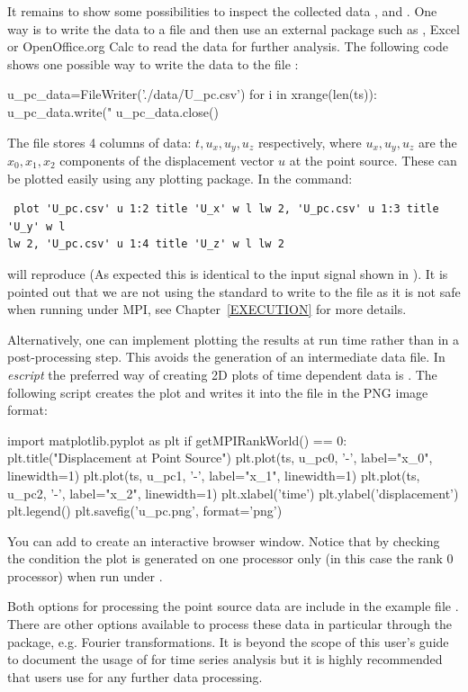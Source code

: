 It remains to show some possibilities to inspect the collected data
,  and .
One way is to write the data to a file and then use an external package such
as \gnuplot, Excel or OpenOffice.org Calc to read the data for further analysis.
The following code shows one possible way to write the data to the file :
\begin{python}
  u_pc_data=FileWriter('./data/U_pc.csv')
  for i in xrange(len(ts)):
      u_pc_data.write("%
  u_pc_data.close()
\end{python}
The file  stores 4 columns of data: $t,u_x,u_y,u_z$
respectively, where $u_x,u_y,u_z$ are the
$x_0,x_1,x_2$ components of the displacement
vector $u$ at the point source.
These can be plotted easily using any plotting package.
In \gnuplot the command:
\begin{verbatim}
 plot 'U_pc.csv' u 1:2 title 'U_x' w l lw 2, 'U_pc.csv' u 1:3 title 'U_y' w l
lw 2, 'U_pc.csv' u 1:4 title 'U_z' w l lw 2
\end{verbatim}
will reproduce  (As expected this is identical to the input
signal shown in ).
It is pointed out that we are not using the standard \PYTHON {}
to write to the file  as it is not safe when running \escript
under MPI, see Chapter~\ref{EXECUTION} for more details.

Alternatively, one can implement plotting the results at run time rather than
in a post-processing step.
This avoids the generation of an intermediate data file.
In {\it escript} the preferred way of creating 2D plots of time dependent data
is \MATPLOTLIB. The following script creates the plot and writes it into the
file  in the PNG image format:
\begin{python}
  import matplotlib.pyplot as plt
  if getMPIRankWorld() == 0:
      plt.title("Displacement at Point Source")
      plt.plot(ts, u_pc0, '-', label="x_0", linewidth=1)
      plt.plot(ts, u_pc1, '-', label="x_1", linewidth=1)
      plt.plot(ts, u_pc2, '-', label="x_2", linewidth=1)
      plt.xlabel('time')
      plt.ylabel('displacement')
      plt.legend()
      plt.savefig('u_pc.png', format='png')
\end{python}
You can add  to create an interactive browser window.
Notice that by checking the condition  the plot
is generated on one processor only (in this case the rank 0 processor) when
run under \MPI. 

Both options for processing the point source data are include in the example
file . There are other options available to process these data
in particular through the \SCIPY package, e.g. Fourier transformations.
It is beyond the scope of this user's guide to document the usage of
\SCIPY for time series analysis but it is highly recommended that users use
\SCIPY for any further data processing.

